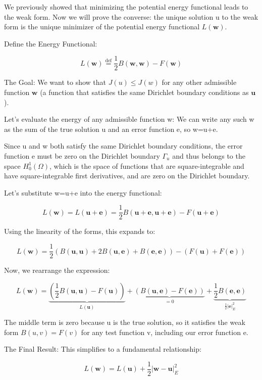 \documentclass[
  11pt,
  a4paper,
]{scrbook}
\begin{document}
We previously showed that minimizing the potential energy functional
leads to the weak form. Now we will prove the converse: the unique
solution u to the weak form is the unique minimizer of the potential
energy functional \(L(\mathbf{w})\).

Define the Energy Functional:

\[L(\mathbf{w}) \overset{\text{def}}{=} \frac{1}{2} B(\mathbf{w}, \mathbf{w}) - F(\mathbf{w})\]

The Goal: We want to show that \(J(u)\leq J(w)\) for any other
admissible function \(\boldsymbol{w}\) (a function that satisfies the
same Dirichlet boundary conditions as \(\boldsymbol{u}\)).

Let's evaluate the energy of any admissible function w: We can write any
such w as the sum of the true solution u and an error function e, so
w=u+e.

Since u and w both satisfy the same Dirichlet boundary conditions, the
error function e must be zero on the Dirichlet boundary \(\Gamma_u\) and
thus belongs to the space \(H^1_0(\Omega)\), which is the space of
functions that are square-integrable and have square-integrable first
derivatives, and are zero on the Dirichlet boundary.

Let's substitute w=u+e into the energy functional:

\[L(\mathbf{w}) = L(\mathbf{u}+\mathbf{e}) = \frac{1}{2}B(\mathbf{u}+\mathbf{e}, \mathbf{u}+\mathbf{e}) - F(\mathbf{u}+\mathbf{e})\]

Using the linearity of the forms, this expands to:

\[L(\mathbf{w}) = \frac{1}{2}\left( B(\mathbf{u},\mathbf{u}) + 2B(\mathbf{u},\mathbf{e}) + B(\mathbf{e},\mathbf{e}) \right) - \left( F(\mathbf{u}) + F(\mathbf{e}) \right)\]

Now, we rearrange the expression:

\[L(\mathbf{w}) = \underbrace{\left( \frac{1}{2}B(\mathbf{u},\mathbf{u}) - F(\mathbf{u}) \right)}_{L(\mathbf{u})} + \underbrace{\left( B(\mathbf{u},\mathbf{e}) - F(\mathbf{e}) \right)}_{=0} + \underbrace{\frac{1}{2}B(\mathbf{e},\mathbf{e})}_{\frac{1}{2}|\mathbf{e}|_E^2}\]

The middle term is zero because u is the true solution, so it satisfies
the weak form \(B(u,v)=F(v)\) for any test function v, including our
error function e.

The Final Result: This simplifies to a fundamental relationship:

\[L(\mathbf{w}) = L(\mathbf{u}) + \frac{1}{2} | \mathbf{w} - \mathbf{u} |_E^2\]
\end{document}
